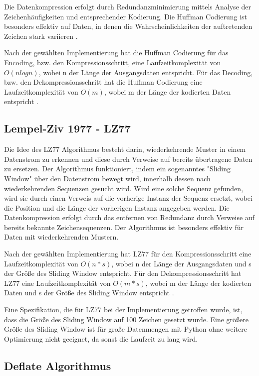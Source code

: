 \documentclass[conference]{IEEEtran}
\begin{document}
Die Datenkompression erfolgt durch Redundanzminimierung mittels Analyse
der Zeichenhäufigkeiten und entsprechender Kodierung.
Die Huffman Codierung ist besonders effektiv auf Daten, in denen die
Wahrscheinlichkeiten der auftretenden Zeichen stark variieren \cite{moffat}.

Nach der gewählten Implementierung hat
die Huffman Codierung für das Encoding, bzw. den Kompressionsschritt, eine
Laufzeitkomplexität von $O(n log n)$, wobei n der Länge der Ausgangsdaten entspricht.
Für das Decoding, bzw. den Dekompressionsschritt hat die Huffman Codierung eine
Laufzeitkomplexität von $O(m)$, wobei m der Länge der kodierten Daten entspricht \cite{moffat}. 


\subsection{Lempel-Ziv 1977 - LZ77}

Die Idee des LZ77 Algorithmus besteht darin, wiederkehrende Muster
in einem Datenstrom zu erkennen und diese durch Verweise auf bereits übertragene 
Daten zu ersetzen.
Der Algorithmus funktioniert, indem ein sogenanntes "Sliding Window" über den Datenstrom 
bewegt wird, innerhalb dessen nach wiederkehrenden Sequenzen gesucht wird.
Wird eine solche Sequenz gefunden, wird sie durch einen Verweis auf die vorherige Instanz 
der Sequenz ersetzt, wobei die Position und die Länge der vorherigen Instanz angegeben werden. 
Die Datenkompression erfolgt durch das entfernen von Redundanz durch Verweise auf bereits
bekannte Zeichensequenzen.
Der Algorithmus ist besonders effektiv für Daten mit wiederkehrenden Mustern.

Nach der gewählten Implementierung hat
LZ77 für den Kompressionsschritt eine Laufzeitkomplexität von
$O(n * s)$, wobei n der Länge der Ausgangsdaten und s der Größe des Sliding 
Window entspricht.
Für den Dekompressionsschritt hat LZ77 eine
Laufzeitkomplexität von $O(m * s)$, wobei m der Länge der kodierten Daten und 
s der Größe des Sliding Window entspricht \cite{nick}. 

Eine Spezifikation, die für LZ77 bei der Implementierung getroffen wurde, 
ist, dass die Größe des Sliding Window auf 100 Zeichen gesetzt wurde. 
Eine größere Größe des Sliding Window ist für große Datenmengen mit Python 
ohne weitere Optimierung nicht geeignet, da sonst die Laufzeit zu lang wird.


\subsection{Deflate Algorithmus}
\label{deflate}
\end{document}
